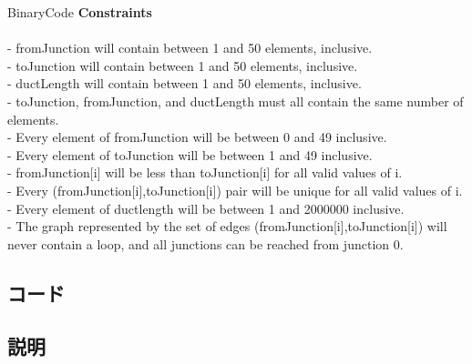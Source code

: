 \documentclass[a4j,10pt,oneside,openany]{jsbook}
\begin{document}
\begin{breakitembox}[l]{BinaryCode}
{\bf Constraints}\\\\
- fromJunction will contain between 1 and 50 elements, inclusive.\\
- toJunction will contain between 1 and 50 elements, inclusive.\\
- ductLength will contain between 1 and 50 elements, inclusive.\\
- toJunction, fromJunction, and ductLength must all contain the same number of elements.\\
- Every element of fromJunction will be between 0 and 49 inclusive.\\
- Every element of toJunction will be between 1 and 49 inclusive.\\
- fromJunction[i] will be less than toJunction[i] for all valid values of i.\\
- Every (fromJunction[i],toJunction[i]) pair will be unique for all valid values of i.\\
- Every element of ductlength will be between 1 and 2000000 inclusive.\\
- The graph represented by the set of edges (fromJunction[i],toJunction[i]) will never contain a loop, and all junctions can be reached from junction 0.\\

\end{breakitembox}
\subsection*{コード}
\begin{framed}

\end{framed}

\subsection*{説明}

\hrulefill

\newpage
\printindex
%
%
\end{document}
